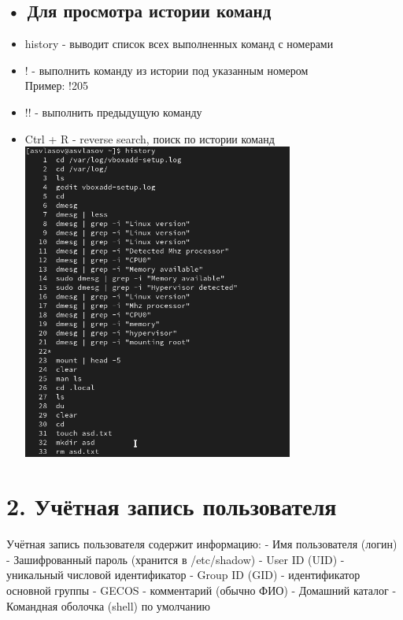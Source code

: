 \documentclass[
  12pt,
  a4paper,
  DIV=11,
  numbers=noendperiod]{scrreprt}
\providecommand{\tightlist}{%
  \setlength{\itemsep}{0pt}\setlength{\parskip}{0pt}}\usepackage{longtable,booktabs,array}
\begin{document}
\subsection{• Для просмотра истории
команд}\label{ux434ux43bux44f-ux43fux440ux43eux441ux43cux43eux442ux440ux430-ux438ux441ux442ux43eux440ux438ux438-ux43aux43eux43cux430ux43dux434}

\begin{itemize}
\tightlist
\item
  history - выводит список всех выполненных команд с номерами
\item
  ! - выполнить команду из истории под указанным номером\\
  Пример: !205
\item
  !! - выполнить предыдущую команду
\item
  Ctrl + R - reverse search, поиск по истории команд
  \includegraphics[width=0.7\textwidth,height=\textheight]{image/24.png}
\end{itemize}

\section{2. Учётная запись
пользователя}\label{ux443ux447ux451ux442ux43dux430ux44f-ux437ux430ux43fux438ux441ux44c-ux43fux43eux43bux44cux437ux43eux432ux430ux442ux435ux43bux44f}

Учётная запись пользователя содержит информацию: - Имя пользователя
(логин) - Зашифрованный пароль (хранится в /etc/shadow) - User ID (UID)
- уникальный числовой идентификатор - Group ID (GID) - идентификатор
основной группы - GECOS - комментарий (обычно ФИО) - Домашний каталог -
Командная оболочка (shell) по умолчанию
\end{document}
